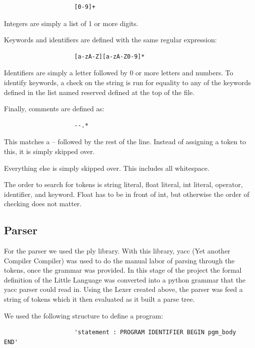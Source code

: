 \documentclass[12pt]{article}
\begin{document}
                \begin{verbatim}
                    [0-9]+
                \end{verbatim}

                Integers are simply a list of 1 or more digits.

                Keywords and identifiers are defined with the same regular expression:

                \begin{verbatim}
                    [a-zA-Z][a-zA-Z0-9]*
                \end{verbatim}

                Identifiers are simply a letter followed by 0 or more letters and numbers. To identify keywords, a check on the string is run for equality to any of the keywords defined in the list named reserved defined at the top of the file.

                Finally, comments are defined as:

                \begin{verbatim}
                    --.*
                \end{verbatim}

                This matches a -- followed by the rest of the line. Instead of assigning a token to this, it is simply skipped over.

                Everything else is simply skipped over. This includes all whitespace.

                The order to search for tokens is string literal, float literal, int literal, operator, identifier, and keyword. Float has to be in front of int, but otherwise the order of checking does not matter.




    	\subsection{Parser}
    		For the parser we used the ply library.  With this library, yacc (Yet another Compiler Compiler) was used to do the manual labor of parsing through the tokens, once the grammar was provided.   In this stage of the project the formal definition of the Little Language was converted into a python grammar that the yacc parser could read in.  Using the Lexer created above, the parser was feed a string of tokens which it then evaluated as it built a parse tree.  
    		
    		We used the following structure to define a program: 
    		\begin{verbatim}
                    'statement : PROGRAM IDENTIFIER BEGIN pgm_body END'
           \end{verbatim}
           
\end{document}

